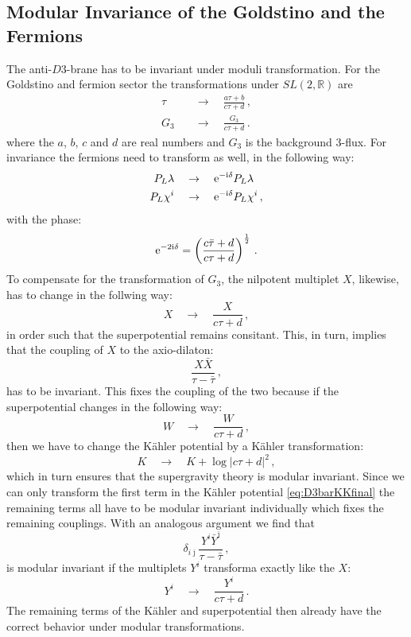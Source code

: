 \documentclass[12pt]{report}
\newcommand{\be}{\begin{equation}}
\newcommand{\ee}{\end{equation}}
\newcommand{\bea}{\begin{equation}\begin{aligned}}
\newcommand{\eea}{\end{aligned}\end{equation}}
\def\rmi{{\rm i}}
\def\rme{{\rm e}}
\def\jb{{\bar \jmath}}
\begin{document}
\subsection{Modular Invariance of the Goldstino and the Fermions}
The anti-$D3$-brane has to be invariant under moduli transformation. For the Goldstino and fermion sector the transformations under $SL(2,\mathbb{R})$ are 
\bea 
\tau \quad &\to \quad \frac{a\tau + b}{c \tau + d}\,,\\
G_3 \quad &\to \quad \frac{G_3}{c\tau + d}\,.
\eea 
where the $a$, $b$, $c$ and $d$ are real numbers and $G_3$ is the background 3-flux. For invariance the fermions need to transform as well, in the following way:
\bea 
P_L \lambda \quad &\to \quad \rme^{-\rmi \delta} P_L \lambda \\
P_L \chi^i \quad &\to \quad \rme^{-\rmi \delta} P_L \chi^i\,,
\eea 
with the phase:
\be 
\rme^{-2\rmi\delta} = \left( \frac{c\bar{\tau}+d}{c \tau + d} \right)^{\frac{1}{2}}\,.
\ee
To compensate for the transformation of $G_3$, the nilpotent multiplet $X$, likewise, has to change in the follwing way:
\be 
X \quad \to \quad \frac{X}{c\tau + d}\,,
\ee
in order such that the superpotential remains consitant. This, in turn, implies that the coupling of $X$ to the axio-dilaton:
\be 
\frac{X \bar{X}}{\tau-\bar{\tau}}\,,
\ee
has to be invariant. This fixes the coupling of the two because if the superpotential changes in the following way:
\be 
W \quad \to \quad \frac{W}{c\tau + d}\,,
\ee
then we have to change the Kähler potential by a Kähler transformation:
\be 
K \quad \to \quad K + \log | c \tau + d |^2\,,
\ee
which in turn ensures that the supergravity theory is modular invariant. Since we can only transform the first term in the Kähler potential \eqref{eq:D3barKKfinal} the remaining terms all have to be modular invariant individually which fixes the remaining couplings. With an analogous argument we find that 
\be 
\delta_{i\jb} \frac{Y^i \bar{Y}^\jb}{\tau-\bar{\tau}}\,,
\ee
is modular invariant if the multiplets $Y^i$ transforma exactly like the $X$:
\be 
Y^i \quad \to \quad \frac{Y^i}{c\tau +d}\,.
\ee
The remaining terms of the Kähler and superpotential then already have the correct behavior under modular transformations.
\end{document}
